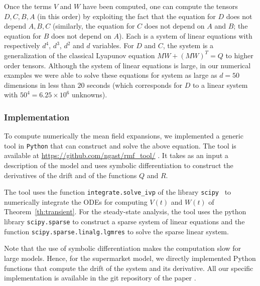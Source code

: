 \documentclass[sigconf]{acmart}
\begin{document}
Once the terms $V$ and $W$ have been computed, one can compute the
tensors $D,C,B,A$ (in this order) by exploiting the fact that the equation for $D$
does not depend $A,B,C$ (similarly, the equation for $C$ does not
depend on $A$ and $B$; the equation for $B$ does not depend on
$A$). Each is a system of linear
equations with respectively $d^4$, $d^3$, $d^2$ and $d$ variables.
For $D$ and $C$, the system is a generalization of the classical
Lyapunov equation $MW+(MW)^T=Q$ to higher order tensors.
Although the system of linear equations is large, in our numerical
examples  we were able to solve these equations for system as large as
$d=50$ dimensions in less than $20$ seconds (which corresponds for $D$
to a linear system with $50^4=6.25\times10^6$ unknowns).

\subsubsection{Implementation}

To compute numerically the mean field expansions, we implemented a
generic tool in \texttt{Python} that can construct and solve the above
equation. The tool is available at
\url{https://github.com/ngast/rmf_tool/} \cite{rmfTool2018}.  It takes as an input a description of the model and uses symbolic
differentiation to construct the derivatives of the drift and of the
functions $Q$ and $R$.

The tool uses the function
\texttt{integrate.solve\_ivp} of the library \texttt{scipy}~\cite{scipy} to numerically integrate the ODEs for computing $V(t)$ and $W(t)$ of Theorem~\ref{th:transient}.  For the steady-state analysis, the tool uses the python
library \texttt{scipy.sparse} to construct a sparse system of linear
equations and the function \texttt{scipy.sparse.linalg.lgmres} to
solve the sparse linear system.

Note that the use of symbolic differentiation makes the computation
slow for large models. Hence, for the supermarket model, we directly
implemented Python functions that compute the drift of the system and
its derivative. All our specific implementation is available in the
git repository of the paper \cite{githubPaper2018}.
\end{document}

